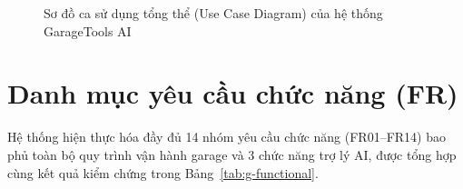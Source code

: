 \begin{figure}[H]
\centering
\vspace{2pt}

\vspace{2pt}
\caption{Sơ đồ ca sử dụng tổng thể (Use Case Diagram) của hệ thống GarageTools AI}
\label{fig:g-usecase}
\end{figure}

\section{Danh mục yêu cầu chức năng (FR)}

Hệ thống hiện thực hóa đầy đủ 14 nhóm yêu cầu chức năng (FR01--FR14) bao phủ toàn bộ quy trình vận hành garage và 3 chức năng trợ lý AI, được tổng hợp cùng kết quả kiểm chứng trong Bảng~\ref{tab:g-functional}.

